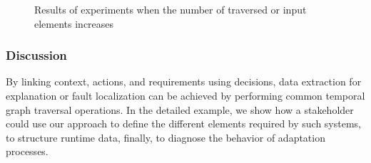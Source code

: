 \begin{figure}
	\centering
	\hfil
	\centering
\caption{Results of experiments when the number of traversed or input elements  increases}
\label{fig:exp-res}
\end{figure}

\subsubsection{Discussion}
By linking context, actions, and requirements using decisions, data extraction for explanation or fault localization can be achieved by performing common temporal graph traversal operations.
In the detailed example, we show how a stakeholder could use our approach to define the different elements required by such systems, to structure runtime data, finally, to diagnose the behavior of adaptation processes. 


